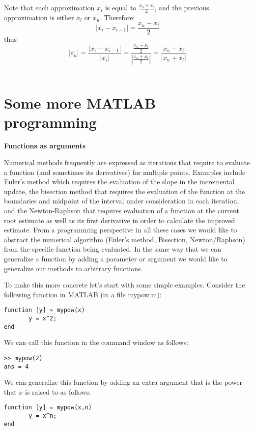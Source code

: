\documentclass [titlepage,12pt,letter] {article}
\begin{document}
Note that each approximation $x_i$ is equal to $\frac{x_u + x_l}{2}$, and the previous approximation is either $x_l$ or $x_u$. Therefore: 
\[
|x_i - x_{i-1}| = \frac{x_u - x_l}{2} 
\] 
\noindent thus 
\[
|\varepsilon_a| = \frac{|x_i-x_{i-1}|}{|x_i|} = \frac{\frac{x_u-x_l}{2}}{\left| \frac{x_u + x_l}{2} \right|} = \frac{x_u - x_l}{|x_u + x_l|}
\] 
\\


\section{Some more MATLAB programming} 


{\bf Functions as arguments}

Numerical methods frequently are expressed as iterations that require
to evaluate a function (and sometimes its derivatives) for multiple
points.  Examples include Euler's method which requires the evaluation
of the slope in the incremental update, the bisection method that
requires the evaluation of the function at the boundaries and midpoint
of the interval under consideration in each iteration, and the
Newton-Raphson that requires evaluation of a function at the current
root estimate as well as its first derivative in order to calculate
the improved estimate. From a programming perspective in all these
cases we would like to abstract the numerical algorithm (Euler's
method, Bisection, Newton/Raphson) from the specific function being
evaluated. In the same way that we can generalize a function by adding
a parameter or argument we would like to generalize our methods to
arbitrary functions.

To make this more concrete let's start with some simple examples. 
Consider the following function in MATLAB (in a file mypow.m): 

\begin{verbatim} 
function [y] = mypow(x)
       y = x^2;
end
\end{verbatim}

\noindent 
We can call this function in the command window as follows: 

\begin{verbatim} 
>> mypow(2) 
ans = 4 
\end{verbatim} 
\noindent 
We can generalize this function by adding an extra argument 
that is the power that $x$ is raised to as follows: 

\begin{verbatim} 
function [y] = mypow(x,n)
       y = x^n;
end
\end{verbatim} 
\end{document}
